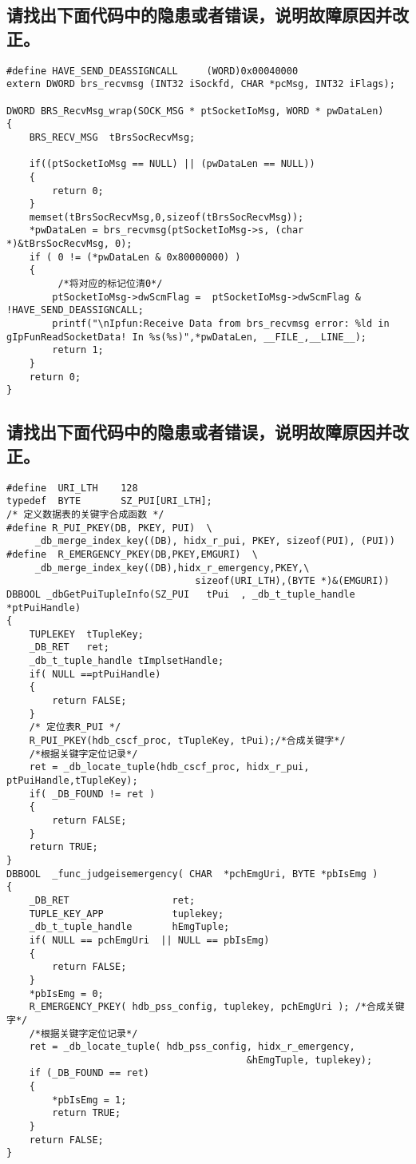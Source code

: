 ﻿\documentclass  [11pt,twocolumn,landscape]{article}
\begin{document}
\subsection{请找出下面代码中的隐患或者错误，说明故障原因并改正。}
\begin{lstlisting}
#define HAVE_SEND_DEASSIGNCALL     (WORD)0x00040000 
extern DWORD brs_recvmsg (INT32 iSockfd, CHAR *pcMsg, INT32 iFlags);

DWORD BRS_RecvMsg_wrap(SOCK_MSG * ptSocketIoMsg, WORD * pwDataLen)
{
    BRS_RECV_MSG  tBrsSocRecvMsg;   

    if((ptSocketIoMsg == NULL) || (pwDataLen == NULL))
    {
        return 0;
    } 
    memset(tBrsSocRecvMsg,0,sizeof(tBrsSocRecvMsg));
    *pwDataLen = brs_recvmsg(ptSocketIoMsg->s, (char *)&tBrsSocRecvMsg, 0);
    if ( 0 != (*pwDataLen & 0x80000000) )
    {
         /*将对应的标记位清0*/
        ptSocketIoMsg->dwScmFlag =  ptSocketIoMsg->dwScmFlag & !HAVE_SEND_DEASSIGNCALL;  
        printf("\nIpfun:Receive Data from brs_recvmsg error: %ld in gIpFunReadSocketData! In %s(%s)",*pwDataLen, __FILE_,__LINE__);
        return 1;
    }
    return 0;
}
\end{lstlisting}
\subsection{请找出下面代码中的隐患或者错误，说明故障原因并改正。}
\begin{lstlisting}
#define  URI_LTH    128
typedef  BYTE       SZ_PUI[URI_LTH];
/* 定义数据表的关键字合成函数 */
#define R_PUI_PKEY(DB, PKEY, PUI)  \
     _db_merge_index_key((DB), hidx_r_pui, PKEY, sizeof(PUI), (PUI))  
#define  R_EMERGENCY_PKEY(DB,PKEY,EMGURI)  \  
     _db_merge_index_key((DB),hidx_r_emergency,PKEY,\
                                 sizeof(URI_LTH),(BYTE *)&(EMGURI))
DBBOOL _dbGetPuiTupleInfo(SZ_PUI   tPui  , _db_t_tuple_handle *ptPuiHandle)
{
    TUPLEKEY  tTupleKey;
    _DB_RET   ret;
    _db_t_tuple_handle tImplsetHandle;
    if( NULL ==ptPuiHandle)
    {
        return FALSE;
    }
    /* 定位表R_PUI */
    R_PUI_PKEY(hdb_cscf_proc, tTupleKey, tPui);/*合成关键字*/
    /*根据关键字定位记录*/    
    ret = _db_locate_tuple(hdb_cscf_proc, hidx_r_pui, ptPuiHandle,tTupleKey);
    if( _DB_FOUND != ret )
    {
        return FALSE;
    }
    return TRUE;
}
DBBOOL  _func_judgeisemergency( CHAR  *pchEmgUri, BYTE *pbIsEmg )
{
    _DB_RET                  ret;
    TUPLE_KEY_APP            tuplekey;
    _db_t_tuple_handle       hEmgTuple;
    if( NULL == pchEmgUri  || NULL == pbIsEmg)
    {
        return FALSE;  
    }   
    *pbIsEmg = 0;   
    R_EMERGENCY_PKEY( hdb_pss_config, tuplekey, pchEmgUri ); /*合成关键字*/
    /*根据关键字定位记录*/
    ret = _db_locate_tuple( hdb_pss_config, hidx_r_emergency, 
                                          &hEmgTuple, tuplekey); 
    if (_DB_FOUND == ret)
    {
        *pbIsEmg = 1;
        return TRUE;
    }
    return FALSE;  
}
\end{lstlisting}
\end{document}
